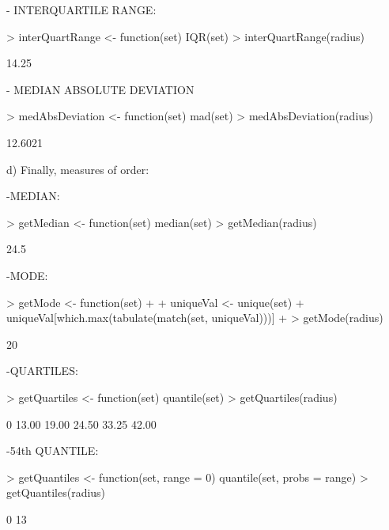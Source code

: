 \documentclass[a4paper]{article}
\begin{document}
			- INTERQUARTILE RANGE:
\begin{Schunk}
\begin{Sinput}
> interQuartRange <- function(set) {IQR(set)}
> interQuartRange(radius)
\end{Sinput}
\begin{Soutput}
[1] 14.25
\end{Soutput}
\end{Schunk}
			- MEDIAN ABSOLUTE DEVIATION
\begin{Schunk}
\begin{Sinput}
> medAbsDeviation <- function(set) {mad(set)}
> medAbsDeviation(radius)
\end{Sinput}
\begin{Soutput}
[1] 12.6021
\end{Soutput}
\end{Schunk}
		d) Finally, measures of order:
		
			-MEDIAN:
\begin{Schunk}
\begin{Sinput}
> getMedian    <- function(set) {median(set)}
> getMedian(radius)
\end{Sinput}
\begin{Soutput}
[1] 24.5
\end{Soutput}
\end{Schunk}
			-MODE:
\begin{Schunk}
\begin{Sinput}
> getMode      <- function(set) 
+ {
+     uniqueVal <- unique(set)
+     uniqueVal[which.max(tabulate(match(set, uniqueVal)))]
+ }
> getMode(radius)
\end{Sinput}
\begin{Soutput}
[1] 20
\end{Soutput}
\end{Schunk}
			-QUARTILES:
\begin{Schunk}
\begin{Sinput}
> getQuartiles <- function(set) {quantile(set)}
> getQuartiles(radius)
\end{Sinput}
\begin{Soutput}
   0%   25%   50%   75%  100% 
13.00 19.00 24.50 33.25 42.00 
\end{Soutput}
\end{Schunk}
			-54th QUANTILE:
\begin{Schunk}
\begin{Sinput}
> getQuantiles <- function(set, range = 0) {quantile(set, probs = range)}
> getQuantiles(radius)
\end{Sinput}
\begin{Soutput}
0% 
13 
\end{Soutput}
\end{Schunk}
\end{document}
